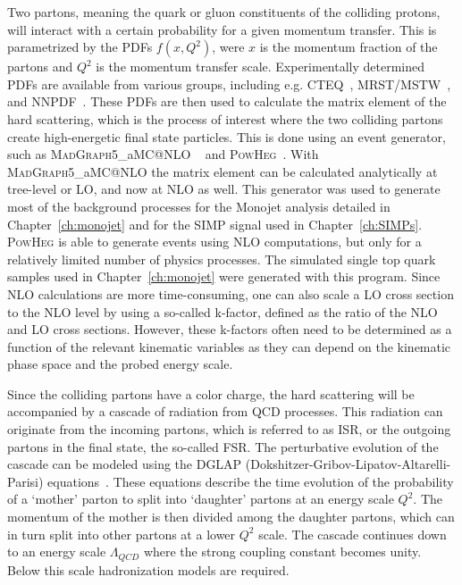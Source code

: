 Two partons, meaning the quark or gluon constituents of the colliding protons, will interact with a certain probability for a given momentum transfer. This is parametrized by the \acp{PDF} $f(x, Q^2)$, were $x$ is the momentum fraction of the partons and $Q^2$ is the momentum transfer scale. Experimentally determined \acp{PDF} are available from various groups, including e.g. CTEQ~\cite{Pumplin:2002vw}, MRST/MSTW~\cite{}, and NNPDF~\cite{}. These \acp{PDF} are then used to calculate the matrix element of the hard scattering, which is the process of interest where the two colliding partons create high-energetic final state particles. This is done using an event generator, such as \textsc{MadGraph5\_}a\textsc{MC@NLO} ~\cite{Alwall:2014hca} and \textsc{PowHeg}~\cite{}. With \textsc{MadGraph5\_}a\textsc{MC@NLO} the matrix element can be calculated analytically at tree-level or \ac{LO}, and now at \ac{NLO} as well. This generator was used to generate most of the background processes for the Monojet analysis detailed in Chapter~\ref{ch:monojet} and for the \ac{SIMP} signal used in Chapter~\ref{ch:SIMPs}. \textsc{PowHeg} is able to generate events using \ac{NLO} computations, but only for a relatively limited number of physics processes. The simulated single top quark samples used in Chapter~\ref{ch:monojet} were generated with this program. Since \ac{NLO} calculations are more time-consuming, one can also scale a \ac{LO} cross section to the \ac{NLO} level by using a so-called k-factor, defined as the ratio of the \ac{NLO} and \ac{LO} cross sections. However, these k-factors often need to be determined as a function of the relevant kinematic variables as they can depend on the kinematic phase space and the probed energy scale.

Since the colliding partons have a color charge, the hard scattering will be accompanied by a cascade of radiation from \acs{QCD} processes. This radiation can originate from the incoming partons, which is referred to as \ac{ISR}, or the outgoing partons in the final state, the so-called \ac{FSR}. The perturbative evolution of the cascade can be modeled using the DGLAP (Dokshitzer-Gribov-Lipatov-Altarelli-Parisi) equations~\cite{}. These equations describe the time evolution of the probability of a `mother' parton to split into `daughter' partons at an energy scale $Q^2$. The momentum of the mother is then divided among the daughter partons, which can in turn split into other partons at a lower $Q^2$ scale. The cascade continues down to an energy scale $\Lambda_{QCD}$ where the strong coupling constant becomes unity. Below this scale hadronization models are required. 

